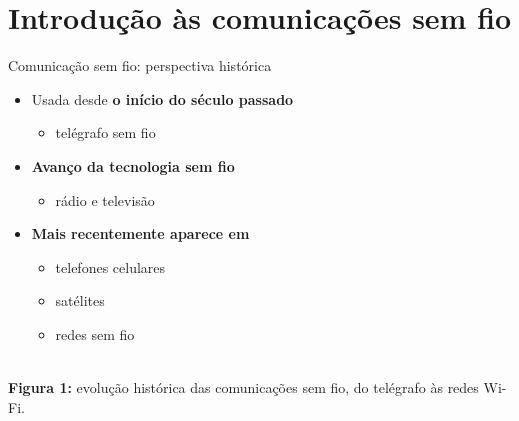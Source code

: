 \documentclass[aspectratio=169,11pt]{beamer}
\begin{document}
\section{Introdução às comunicações sem fio}

\begin{frame}{Comunicação sem fio: perspectiva histórica}
  \begin{itemize}
    \item Usada desde \textbf{o início do século passado}
      \begin{itemize}
        \item telégrafo sem fio
      \end{itemize}
    \item \textbf{Avanço da tecnologia sem fio}
      \begin{itemize}
        \item rádio e televisão
      \end{itemize}
    \item \textbf{Mais recentemente aparece em}
      \begin{itemize}
        \item telefones celulares
        \item satélites
        \item redes sem fio
      \end{itemize}
  \end{itemize}
  \begin{center}
    \\[1mm]
    {\scriptsize \textbf{Figura 1:} evolução histórica das comunicações sem fio, do telégrafo às redes Wi-Fi.}
  \end{center}
\end{frame}
\end{document}
